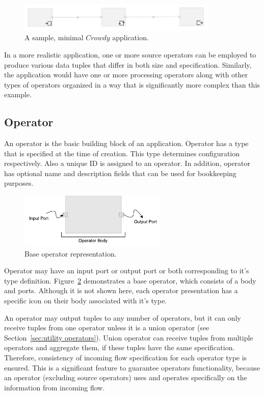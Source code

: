 \begin{figure}[ht]
	\centering
	\includegraphics[width=0.85\textwidth]{figures/helloworld.png}
	\caption{A sample, minimal $Crowdy$ application.}
	\label{fig:hello world}
\end{figure}

In a more realistic application, one or more source operators can be employed to produce 
various data tuples that differ in both size and specification. Similarly, the application would 
have one or more processing operators along with other types of operators organized in a way 
that is significantly more complex than this example.

\subsection{Operator}
An operator is the basic building block of an application. Operator has a type that is 
specified at the time of creation. This type determines configuration respectively. Also a 
unique ID is assigned to an operator. In addition, operator has optional name and 
description fields that can be used for bookkeeping purposes.

\begin{figure}[ht]
	\centering
	\includegraphics[height=100px]{figures/basicoperator.pdf}
	\caption{Base operator representation.}
	\label{fig:basic operator}
\end{figure}

Operator may have an input port or output port or both corresponding to it's type 
definition. Figure~\ref{fig:basic operator} demonstrates a base operator, which 
consists of a body and ports. Although it is not shown here, each operator presentation 
has a specific icon on their body associated with it's type.

An operator may output tuples to any number of operators, but it can only receive 
tuples from one operator unless it is a union operator (see Section~\ref{sec:utility operators}). 
Union operator can receive tuples from multiple operators and aggregate them,
if these tuples have the same specification. Therefore, consistency of incoming flow 
specification for each operator type is ensured. 
This is a significant feature to guarantee operators functionality, because an operator 
(excluding source operators) uses and operates specifically on the 
information from incoming flow.

